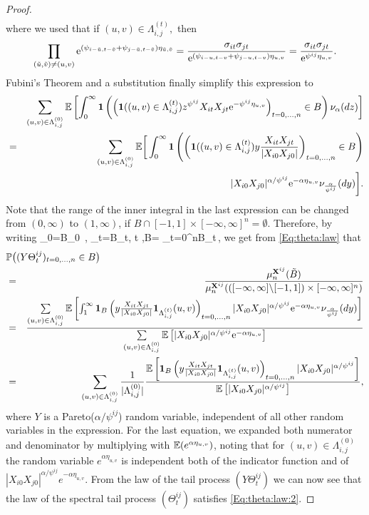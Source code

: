 \begin{proof}
\begin{eqnarray*}
\end{eqnarray*}
where we used that if $(u,v) \in \Lambda_{i,j}^{(t)},$ then 
$$ \prod_{(\tilde{u},\tilde{v}) \neq (u,v)}{\rm e}^{(\psi_{i-\tilde{u},t-\tilde{v}}+\psi_{j-\tilde{u},t-\tilde{v}})\eta_{\tilde{u},\tilde{v}}}= \frac{\sigma_{it}\sigma_{jt}}{{\rm e}^{(\psi_{i-u,t-v}+\psi_{j-u,t-v})\eta_{u,v}}}=\frac{\sigma_{it}\sigma_{jt}}{{\rm e}^{\psi^{ij}\eta_{u,v}}}. $$  
Fubini's Theorem and a substitution finally simplify this expression to 
\begin{eqnarray*}
&&
\sum_{(u,v) \in \Lambda_{i,j}^{(0)}}{\mathbb E}\left[\int_0^\infty \mathbf{1}\left(\left(\mathbf{1}((u,v) \in \Lambda_{i,j}^{(t)})z^{\psi^{ij}}X_{it}X_{jt}{\rm e}^{-\psi^{ij}\eta_{u,v}}\right)_{t=0, \ldots, n} \in B\right)\nu_\alpha(dz)\right]  \\
&=&
\sum_{(u,v) \in \Lambda_{i,j}^{(0)}}{\mathbb E}\bigg[\int_0^\infty \mathbf{1}\left(\left(\mathbf{1}((u,v) \in \Lambda_{i,j}^{(t)})y \frac{X_{it}X_{jt}}{|X_{i0}X_{j0}|}\right)_{t=0, \ldots, n} \in B\right) \\
&&
|X_{i0}X_{j0}|^{\alpha/\psi^{ij}}{\rm e}^{-\alpha \eta_{u,v}}\nu_{\frac{\alpha}{\psi^{ij}}}(dy)\bigg].
\end{eqnarray*}
Note that the range of the inner integral in the last expression can be changed 
from $(0, \infty)$ to $(1,\infty)$, if $B \cap [-1,1] \times [-\infty,\infty]^n = \emptyset$. 
Therefore, by writing
\beao
{}_0=B_0 \setminus [-1,1] \,, \quad {}_t=B_t, \quad t ,\quad \tilde B=
\times_{t=0}^n\tilde B_t\,,
\eeao 
we get from \eqref{Eq:theta:law} that
\begin{eqnarray*}
\lefteqn{\P\big((Y \Theta^{ij}_t)_{t=0,\ldots,n} \in B\big)}\\
&=&
\frac{\mu^{\bfX^{ij}}_n(\tilde{B})}{\mu^{\bfX^{ij}}_n(
([-\infty,\infty]\backslash [-1,1])\times [-\infty,\infty]^n)}\\
&=&
\frac{\sum\limits_{(u,v) \in \Lambda_{i,j}^{(0)}}\E\left[\int_1^\infty
\I_B\left(y \frac{X_{it}X_{jt}}{|X_{i0}X_{j0}|}\I_{\Lambda_{i,j}^{(t)}}(u,v)\right)_{t=0, \ldots, n}|X_{i0}X_{j0}|^{\alpha/\psi^{ij}}\ex^{-\alpha \eta_{u,v}}\nu_{\frac{\alpha}{\psi^{ij}}}(dy)\right]}{\sum\limits_{(u,v) \in \Lambda_{i,j}^{(0)}}\E\left[|X_{i0}X_{j0}|^{\alpha/\psi^{ij}}\ex^{-\alpha \eta_{u,v}}\right]} \\
&=&
\sum\limits_{(u,v) \in \Lambda_{i,j}^{(0)}}\frac{1}{| \Lambda_{i,j}^{(0)}|}\frac{\E\left[
\I_B\left(y \frac{X_{it}X_{jt}}{|X_{i0}X_{j0}|}\I_{\Lambda_{i,j}^{(t)}}(u,v)\right)_{t=0, \ldots, n}|X_{i0}X_{j0}|^{\alpha/\psi^{ij}}\right]}{\E\left[|X_{i0}X_{j0}|^{\alpha/\psi^{ij}}\right]},
\end{eqnarray*}
where $Y$ is a Pareto($\alpha/\psi^{ij}$) random variable, independent of all other random variables in the expression. For the last equation, we expanded both numerator and denominator by multiplying with ${\mathbb E}(e^{\alpha \eta_{u,v}})$, noting that for $(u,v) \in \Lambda_{i,j}^{(0)}$ the random variable $e^{\alpha \eta_{u,v}}$ is independent both of the indicator function and of $|X_{i0}X_{j0}|^{\alpha/\psi^{ij}}e^{-\alpha \eta_{u,v}}$. From the law of the tail process $(Y \Theta_t^{ij})$ we can now see that the law of the spectral tail process $(\Theta_t^{ij})$ satisfies \eqref{Eq:theta:law:2}.
\end{proof}

